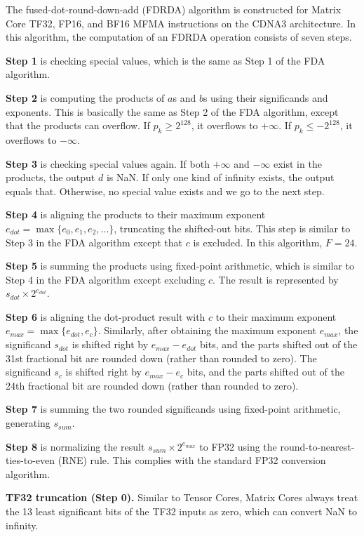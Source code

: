 The fused-dot-round-down-add (FDRDA) algorithm is constructed for Matrix Core TF32, FP16, and BF16 MFMA instructions on the CDNA3 architecture. In this algorithm, the computation of an FDRDA operation consists of seven steps.

\textbf{Step 1} is checking special values, which is the same as Step 1 of the FDA algorithm.

\textbf{Step 2} is computing the products of $a$s and $b$s using their significands and exponents. This is basically the same as Step 2 of the FDA algorithm, except that the products can overflow. If $p_k\ge2^{128}$, it overflows to $+\infty$. If $p_k\le -2^{128}$, it overflows to $-\infty$.

\textbf{Step 3} is checking special values again. If both $+\infty$ and $-\infty$ exist in the products, the output $d$ is NaN. If only one kind of infinity exists, the output equals that. Otherwise, no special value exists and we go to the next step.

\textbf{Step 4} is aligning the products to their maximum exponent $e_{dot}=\max \{e_0, e_1, e_2, ...\}$, truncating the shifted-out bits. This step is similar to Step 3 in the FDA algorithm except that $c$ is excluded. In this algorithm, $F=24$.

\textbf{Step 5} is summing the products using fixed-point arithmetic, which is similar to Step 4 in the FDA algorithm except excluding $c$. The result is represented by $s_{dot}\times 2^{e_{dot}}$.

\textbf{Step 6} is aligning the dot-product result with $c$ to their maximum exponent $e_{max}=\max \{e_{dot}, e_c\}$. Similarly, after obtaining the maximum exponent $e_{max}$, the significand $s_{dot}$ is shifted right by $e_{max}-e_{dot}$ bits, and the parts shifted out of the 31st fractional bit are rounded down (rather than rounded to zero). The significand $s_c$ is shifted right by $e_{max}-e_c$ bits, and the parts shifted out of the 24th fractional bit are rounded down (rather than rounded to zero).

\textbf{Step 7} is summing the two rounded significands using fixed-point arithmetic, generating $s_{sum}$.

\textbf{Step 8} is normalizing the result $s_{sum}\times 2^{e_{max}}$ to FP32 using the round-to-nearest-ties-to-even (RNE) rule. This complies with the standard FP32 conversion algorithm.

\textbf{TF32 truncation (Step 0).} Similar to Tensor Cores, Matrix Cores always treat the 13 least significant bits of the TF32 inputs as zero, which can convert NaN to infinity.

